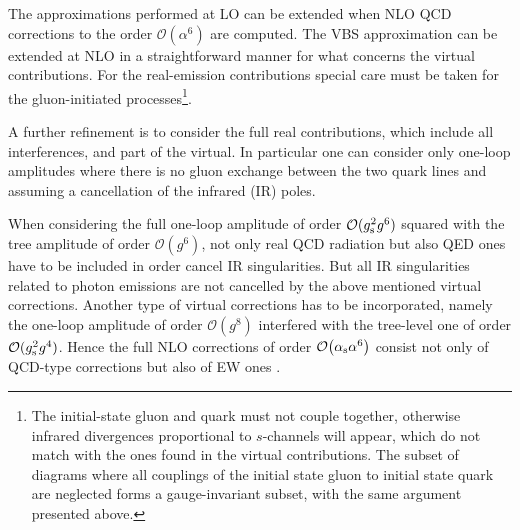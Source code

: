 The approximations performed at LO can be extended when NLO QCD corrections to the order $\mathcal{O}{\left(\alpha^{6}\right)}$ are computed.
The VBS approximation can be extended at NLO in a straightforward manner for what concerns the virtual contributions.
For the real-emission contributions special care must be taken for the gluon-initiated processes\footnote{The initial-state gluon and quark 
    must not couple together, otherwise infrared divergences proportional to $s$-channels will appear, 
     which do not match with the ones found in the virtual contributions.
     The subset of diagrams where all couplings of the initial state gluon to initial state quark are neglected forms a gauge-invariant subset, with the same argument presented above.}.
     \iffalse
This is implemented in the {\sc Powheg-Box}.
This approximation can be used in combination with a double-pole approximation \cite{Dittmaier:2015bfe} for the virtual contribution.
Such an approximation is implemented in {\sc Bonsay}.
In {\sc VBFNLO}, the $s$-channel contributions are available as well and can be
added on top of the VBS approximation. For the real emission diagrams, thereby
as simplification the gluon emission is fully modelled only for initial-state
radiation\AK{I don't understand this sentence. What does 'thereby' refer to?}. The effect of final-state radiation together with the corresponding
virtual contributions is included as a $K$-factor. 
\fi

A further refinement is to consider the full real contributions, which include all interferences, and part of the virtual.
In particular one can consider only one-loop amplitudes where there is no gluon exchange between the two quark lines and 
assuming a cancellation of the infrared (IR) poles.

When considering the full one-loop amplitude of order $\mathcal{O}(g_{\rm s}^2 g^6)$ squared with the tree amplitude of order $\mathcal{O}(g^6)$, not only real QCD radiation but also QED ones have to be included in order cancel IR singularities.
But all IR singularities related to photon emissions are not cancelled by the above mentioned virtual corrections.
Another type of virtual corrections has to be incorporated, namely the one-loop amplitude of order $\mathcal{O}(g^8)$ interfered with the tree-level one of order $\mathcal{O}(g_{\rm s}^2 g^4)$.
Hence the full NLO corrections of order $\mathcal{O}{\left(\alpha_\text{s} \alpha^{6}\right)}$ consist not only of QCD-type corrections but also of EW ones \cite{Biedermann:2017bss}.

